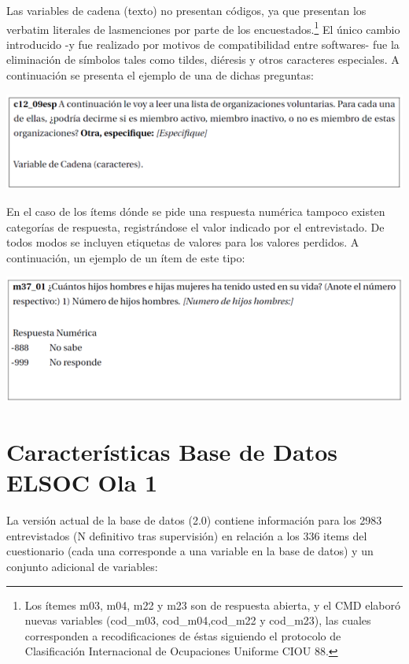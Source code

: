\documentclass[
]{book}
\begin{document}
Las variables de cadena (texto) no presentan códigos, ya que presentan los verbatim literales de lasmenciones por parte de los encuestados.\footnote{Los ítemes m03, m04, m22 y m23 son de respuesta abierta, y el CMD elaboró nuevas variables (cod\_m03, cod\_m04,cod\_m22 y cod\_m23), las cuales corresponden a recodificaciones de éstas siguiendo el protocolo de Clasificación Internacional de Ocupaciones Uniforme CIOU 88.} El único cambio introducido -y fue realizado por motivos de compatibilidad entre softwares- fue la eliminación de símbolos tales como tildes, diéresis y otros caracteres especiales. A continuación se presenta el ejemplo de una de dichas preguntas:

\begin{center}\includegraphics[width=0.9\linewidth,height=0.9\textheight]{imagenes/c12_09} \end{center}

En el caso de los ítems dónde se pide una respuesta numérica tampoco existen categorías de respuesta, registrándose el valor indicado por el entrevistado. De todos modos se incluyen etiquetas de valores para los valores perdidos. A continuación, un ejemplo de un ítem de este tipo:

\begin{center}\includegraphics[width=0.9\linewidth,height=0.9\textheight]{imagenes/m37_01} \end{center}

\hypertarget{caracteruxedsticas-base-de-datos-elsoc-ola-1}{%
\section{Características Base de Datos ELSOC Ola 1}\label{caracteruxedsticas-base-de-datos-elsoc-ola-1}}

La versión actual de la base de datos (2.0) contiene información para los 2983 entrevistados (N definitivo tras supervisión) en relación a los 336 items del cuestionario (cada una corresponde a una variable en la base de datos) y un conjunto adicional de variables:
\end{document}
